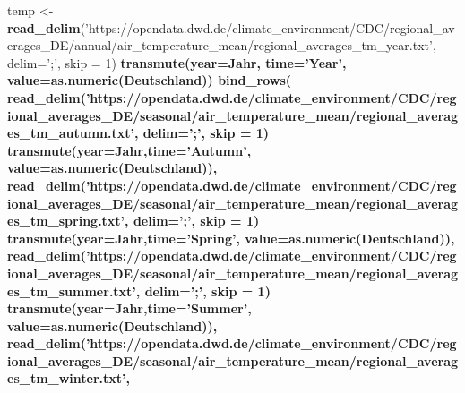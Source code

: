 \documentclass[
]{article}
\newenvironment{Shaded}{\begin{snugshade}}{\end{snugshade}}
\newcommand{\DataTypeTok}[1]{\textcolor[rgb]{0.13,0.29,0.53}{#1}}
\newcommand{\DecValTok}[1]{\textcolor[rgb]{0.00,0.00,0.81}{#1}}
\newcommand{\KeywordTok}[1]{\textcolor[rgb]{0.13,0.29,0.53}{\textbf{#1}}}
\newcommand{\NormalTok}[1]{#1}
\newcommand{\OperatorTok}[1]{\textcolor[rgb]{0.81,0.36,0.00}{\textbf{#1}}}
\newcommand{\StringTok}[1]{\textcolor[rgb]{0.31,0.60,0.02}{#1}}
\begin{document}
\begin{Shaded}
\begin{Highlighting}[]
\NormalTok{temp <-}\StringTok{ }\KeywordTok{read_delim}\NormalTok{(}\StringTok{'https://opendata.dwd.de/climate_environment/CDC/regional_averages_DE/annual/air_temperature_mean/regional_averages_tm_year.txt'}\NormalTok{,}
                   \DataTypeTok{delim=}\StringTok{';'}\NormalTok{, }\DataTypeTok{skip =} \DecValTok{1}\NormalTok{) }\OperatorTok{%
\StringTok{  }\KeywordTok{transmute}\NormalTok{(}\DataTypeTok{year=}\NormalTok{Jahr, }\DataTypeTok{time=}\StringTok{'Year'}\NormalTok{, }\DataTypeTok{value=}\KeywordTok{as.numeric}\NormalTok{(Deutschland)) }\OperatorTok{%
\StringTok{  }\KeywordTok{bind_rows}\NormalTok{(}
    \KeywordTok{read_delim}\NormalTok{(}\StringTok{'https://opendata.dwd.de/climate_environment/CDC/regional_averages_DE/seasonal/air_temperature_mean/regional_averages_tm_autumn.txt'}\NormalTok{,}
               \DataTypeTok{delim=}\StringTok{';'}\NormalTok{, }\DataTypeTok{skip =} \DecValTok{1}\NormalTok{) }\OperatorTok{%
\StringTok{      }\KeywordTok{transmute}\NormalTok{(}\DataTypeTok{year=}\NormalTok{Jahr,}\DataTypeTok{time=}\StringTok{'Autumn'}\NormalTok{, }\DataTypeTok{value=}\KeywordTok{as.numeric}\NormalTok{(Deutschland)),}
    \KeywordTok{read_delim}\NormalTok{(}\StringTok{'https://opendata.dwd.de/climate_environment/CDC/regional_averages_DE/seasonal/air_temperature_mean/regional_averages_tm_spring.txt'}\NormalTok{,}
               \DataTypeTok{delim=}\StringTok{';'}\NormalTok{, }\DataTypeTok{skip =} \DecValTok{1}\NormalTok{) }\OperatorTok{%
\StringTok{      }\KeywordTok{transmute}\NormalTok{(}\DataTypeTok{year=}\NormalTok{Jahr,}\DataTypeTok{time=}\StringTok{'Spring'}\NormalTok{, }\DataTypeTok{value=}\KeywordTok{as.numeric}\NormalTok{(Deutschland)),}
    \KeywordTok{read_delim}\NormalTok{(}\StringTok{'https://opendata.dwd.de/climate_environment/CDC/regional_averages_DE/seasonal/air_temperature_mean/regional_averages_tm_summer.txt'}\NormalTok{,}
               \DataTypeTok{delim=}\StringTok{';'}\NormalTok{, }\DataTypeTok{skip =} \DecValTok{1}\NormalTok{) }\OperatorTok{%
\StringTok{      }\KeywordTok{transmute}\NormalTok{(}\DataTypeTok{year=}\NormalTok{Jahr,}\DataTypeTok{time=}\StringTok{'Summer'}\NormalTok{, }\DataTypeTok{value=}\KeywordTok{as.numeric}\NormalTok{(Deutschland)),}
    \KeywordTok{read_delim}\NormalTok{(}\StringTok{'https://opendata.dwd.de/climate_environment/CDC/regional_averages_DE/seasonal/air_temperature_mean/regional_averages_tm_winter.txt'}\NormalTok{,}
}}}}}
\end{Highlighting}
\end{Shaded}
\end{document}
